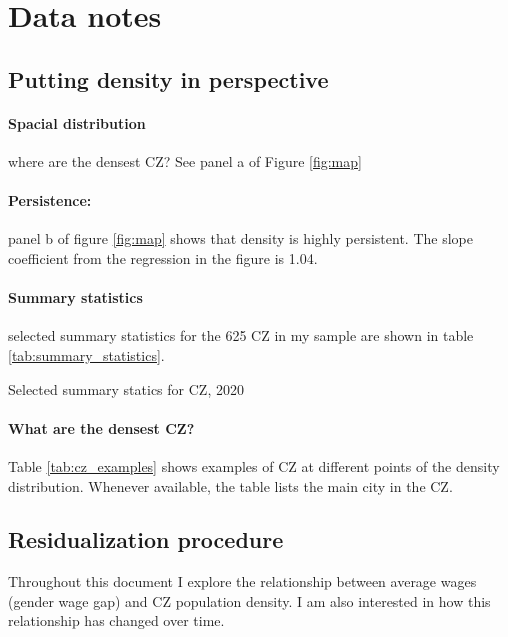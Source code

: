 \section{Data notes}
\subsection{Putting density in perspective}
\paragraph{Spacial distribution} where are the densest CZ? See panel a of Figure \ref{fig:map}



\paragraph{Persistence:} panel b of figure \ref{fig:map} shows that density is highly persistent. The slope coefficient from the regression in the figure is 1.04.

\paragraph{Summary statistics} selected summary statistics for the 625 CZ in my sample are shown in table \ref{tab:summary_statistics}.


\begin{table}
\caption{Selected summary statics for CZ, 2020}
\label{tab:summary_statistics}

\end{table}

\paragraph{What are the densest CZ?}
Table \ref{tab:cz_examples} shows examples of CZ at different points of the density distribution. Whenever available, the table lists the main city in the CZ.



\subsection{Residualization procedure}
Throughout this document I explore the relationship between average wages (gender wage gap) and CZ population density. I am also interested in how this relationship has changed over time.

